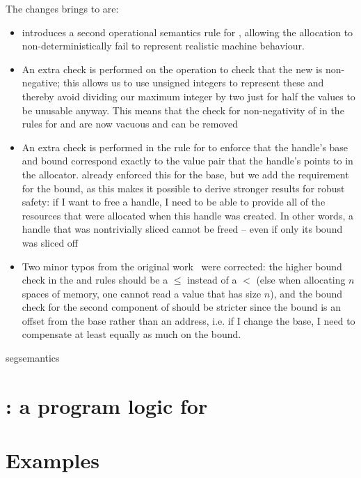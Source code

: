 \documentclass[acmsmall,screen]{acmart}\settopmatter{}
\begin{document}
The changes \irismswasm brings to \mswasm are:
\begin{itemize}
\item \irismswasm introduces a second operational semantics rule for \xxWsegalloc, allowing the allocation to non-deterministically fail to represent realistic machine behaviour. 
\item An extra check is performed on the \xxWhandleadd operation to check that the new \xxWoffset is non-negative; this allows us to use unsigned integers to represent these and thereby avoid dividing our maximum integer by two just for half the values to be unusable anyway. This means that the check for non-negativity of \xxWoffset in the rules for \xxWsegload and \xxWsegstore are now vacuous and can be removed
\item An extra check is performed in the rule for \xxWsegfree to enforce that the handle's base and bound correspond exactly to the value pair that the handle's \xxWid points to in the allocator. \mswasm already enforced this for the base, but we add the requirement for the bound, as this makes it possible to derive stronger results for robust safety: if I want to free a handle, I need to be able to provide all of the resources that were allocated when this handle was created. In other words, a handle that was nontrivially sliced cannot be freed -- even if only its bound was sliced off
\item Two minor typos from the original work~\cite{mswasm} were corrected: the higher bound check in the \xxWsegload and \xxWsegstore rules should be a \( \leq \) instead of a \( < \) (else when allocating \( n \) spaces of memory, one cannot read a value that has size \( n \)), and the bound check for the second component of \xxWslice should be stricter since the bound is an offset from the base rather than an address, i.e. if I change the base, I need to compensate at least equally as much on the bound.
\end{itemize}


{segsemantics}







\section{\irismswasm: a program logic for \mswasm}

\section{Examples}





\end{document}
